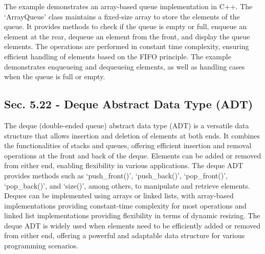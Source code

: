 \begin{solution}
    \horizontalline

    The example demonstrates an array-based queue implementation in C++. The `ArrayQueue' class maintains a fixed-size array to store the elements of the queue. It provides methods to check if the queue is empty or full, enqueue an element at the rear, dequeue an element from the front, and display the queue elements. The operations are performed in constant time complexity, ensuring efficient handling 
    of elements based on the FIFO principle. The example demonstrates enqueueing and dequeueing elements, as well as handling cases when the queue is full or empty.
\end{solution}

\subsection*{Sec. 5.22 - Deque Abstract Data Type (ADT)}

The deque (double-ended queue) abstract data type (ADT) is a versatile data structure that allows insertion and deletion of elements at both ends. It combines the functionalities of stacks and queues, offering efficient insertion and removal operations at the front and back of the deque. Elements can be added or removed from either end, enabling flexibility in various applications. The deque ADT provides 
methods such as `push\_front()', `push\_back()', `pop\_front()', `pop\_back()', and `size()', among others, to manipulate and retrieve elements. Deques can be implemented using arrays or linked lists, with array-based implementations providing constant-time complexity for most operations and linked list implementations providing flexibility in terms of dynamic resizing. The deque ADT is widely used when elements 
need to be efficiently added or removed from either end, offering a powerful and adaptable data structure for various programming scenarios.